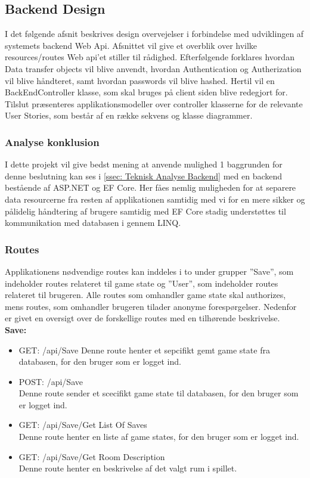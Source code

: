 \subsection{Backend Design}
\label{ssec: Backend Design}

I det følgende afsnit beskrives design overvejelser i forbindelse med udviklingen af systemets backend Web Api. Afsnittet vil give et overblik over hvilke resources/routes Web api’et stiller til rådighed. Efterfølgende forklares hvordan Data transfer objects vil blive anvendt, hvordan Authentication og Autherization vil blive håndteret, samt hvordan passwords vil blive hashed. Hertil vil en BackEndController klasse, som skal bruges på client siden blive redegjort for. Tilslut præsenteres applikationsmodeller over controller klasserne for de relevante User Stories, som består af en række sekvens og klasse diagrammer.\\

\subsubsection{Analyse konklusion}
I dette projekt vil give bedst mening at anvende mulighed 1 baggrunden for denne beslutning kan ses i \autoref{ssec: Teknisk Analyse Backend} med en backend bestående af ASP.NET og EF Core. Her fåes nemlig muligheden for at separere data resourcerne fra resten af applikationen samtidig med vi for en mere sikker og pålidelig håndtering af brugere samtidig med EF Core stadig understøttes til kommunikation med databasen i gennem LINQ. \cite{Language-Integrated-Query}\\


\subsubsection{Routes}
Applikationens nødvendige routes kan inddeles i to under grupper ”Save”, som indeholder routes relateret til game state og ”User”, som indeholder routes relateret til brugeren. Alle routes som omhandler game state skal authorizes, mens routes, som omhandler brugeren tilader anonyme forespørgelser. Nedenfor er givet en oversigt over de forskellige routes med en tilhørende beskrivelse.\\

\textbf{Save:}\\
\begin{itemize}
\item GET: /api/Save
Denne route henter et sepcifikt gemt game state fra databasen, for den bruger som er logget ind.
\item POST: /api/Save\\
Denne route sender et scecifikt game state til databasen, for den bruger som er logget ind.
\item GET: /api/Save/Get List Of Saves\\
Denne route henter en liste af game states, for den bruger som er logget ind. 
\item GET: /api/Save/Get Room Description\\
Denne route henter en beskrivelse af det valgt rum i spillet.
\end{itemize}

